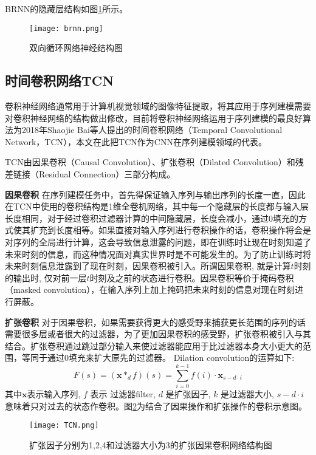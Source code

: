BRNN的隐藏层结构如图\ref{fig:brnn}所示。
\begin{figure}[htb]
  \centering
  \texttt{[image: brnn.png]}\\
  \caption{双向循环网络神经结构图}
  \label{fig:brnn}
\end{figure}

\subsection{时间卷积网络TCN}
卷积神经网络通常用于计算机视觉领域的图像特征提取，将其应用于序列建模需要对卷积神经网络的结构做出修改，目前将卷积神经网络运用于序列建模的最良好算法为2018年Shaojie Bai等人提出的时间卷积网络（Temporal Convolutional Network，TCN）\cite{TCN2018}，本文在此把TCN作为CNN在序列建模领域的代表。

TCN由因果卷积（Causal Convolution）、扩张卷积（Dilated Convolution）和残差链接（Residual Connection）三部分构成。

\textbf{因果卷积}
在序列建模任务中，首先得保证输入序列与输出序列的长度一直，因此在TCN中使用的卷积结构是1维全卷机网络，其中每一个隐藏层的长度都与输入层长度相同，对于经过卷积过滤器计算的中间隐藏层，长度会减小，通过0填充的方式使其扩充到长度相等。如果直接对输入序列进行卷积操作的话，卷积操作将会是对序列的全局进行计算，这会导致信息泄露的问题，即在训练时让现在时刻知道了未来时刻的信息，而这种情况面对真实世界时是不可能发生的。为了防止训练时将未来时刻信息泄露到了现在时刻，因果卷积被引入。所谓因果卷积, 就是计算$t$时刻的输出时, 仅对前一层$t$时刻及之前的状态进行卷积。因果卷积等价于掩码卷积（masked convolution）\cite{DBLP:journals/corr/OordKK16}，在输入序列上加上掩码把未来时刻的信息对现在时刻进行屏蔽。

\textbf{扩张卷积}
对于因果卷积，如果需要获得更大的感受野来捕获更长范围的序列的话需要很多层或者很大的过滤器，为了更加因果卷积的感受野，扩张卷积被引入与其结合。扩张卷积通过跳过部分输入来使过滤器能应用于比过滤器本身大小更大的范围，等同于通过0填充来扩大原先的过滤器。
Dilation convolution的运算如下:
$$
  F(s)=\left(\mathbf{x} *_{d} f\right)(s)=\sum_{i=0}^{k-1} f(i) \cdot \mathbf{x}_{s-d \cdot i}
$$
其中$\mathbf {x}$表示输入序列, $f$ 表示 过滤器filter, $d$ 是扩张因子,%
 $k$ 是过滤器大小,  $s-d\cdot i$意味着只对过去的状态作卷积。图\ref{fig:TCN}为结合了因果操作和扩张操作的卷积示意图。
\begin{figure}[htb]
  \centering
  \texttt{[image: TCN.png]}\\
  \caption{扩张因子分别为1,2,4和过滤器大小为3的扩张因果卷积网络结构图}
  \label{fig:TCN}
\end{figure}

